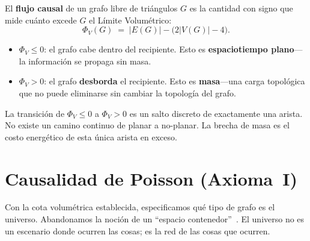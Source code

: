 \documentclass[11pt, a4paper, openany]{book}
\begin{document}
\begin{definition}
\label{def:causal-flux}
El \textbf{flujo causal} de un grafo libre de tri\'angulos $G$ es la
cantidad con signo que mide cu\'anto excede $G$ el L\'imite
Volum\'etrico:
\begin{equation}
\label{eq:causal-flux}
  \Phi_V(G) \;=\; |E(G)| - \bigl(2|V(G)| - 4\bigr).
\end{equation}
\begin{itemize}
  \item $\Phi_V \leq 0$: el grafo cabe dentro del recipiente.
        Esto es \textbf{espaciotiempo plano}---la informaci\'on se
        propaga sin masa.
  \item $\Phi_V > 0$: el grafo \textbf{desborda} el recipiente.
        Esto es \textbf{masa}---una carga topol\'ogica que no puede
        eliminarse sin cambiar la topolog\'ia del grafo.
\end{itemize}
La transici\'on de $\Phi_V \leq 0$ a $\Phi_V > 0$ es un salto discreto
de exactamente una arista. No existe un camino continuo de planar a
no-planar. La brecha de masa es el costo energ\'etico de esta \'unica
arista en exceso.
\end{definition}

\section{Causalidad de Poisson (Axioma~I)}
\label{sec:poisson-causality}

Con la cota volum\'etrica establecida, especificamos qu\'e tipo de grafo
es el universo. Abandonamos la noci\'on de un ``espacio
contenedor''~\cite{malament1977,hawking1976,kronheimer1967}. El
universo no es un escenario donde ocurren las cosas; es la red de las
cosas que ocurren.
\end{document}
